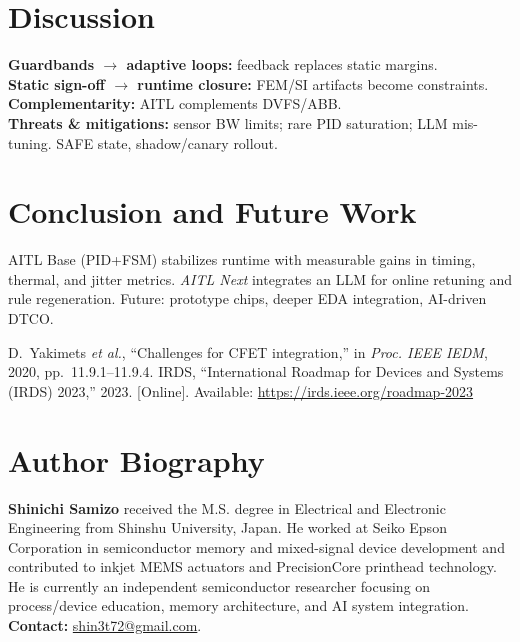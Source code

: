 \documentclass[conference]{IEEEtran}
\newcommand{\etal}{\textit{et al.}}
\begin{document}
\section{Discussion}
\textbf{Guardbands $\rightarrow$ adaptive loops:} feedback replaces static margins.\\
\textbf{Static sign-off $\rightarrow$ runtime closure:} FEM/SI artifacts become constraints.\\
\textbf{Complementarity:} AITL complements DVFS/ABB.\\
\textbf{Threats \& mitigations:} sensor BW limits; rare PID saturation; LLM mis-tuning. SAFE state, shadow/canary rollout.

\section{Conclusion and Future Work}
AITL Base (PID+FSM) stabilizes runtime with measurable gains in timing, thermal, and jitter metrics. \emph{AITL Next} integrates an LLM for online retuning and rule regeneration. Future: prototype chips, deeper EDA integration, AI-driven DTCO.

\begin{thebibliography}{99}
D.~Yakimets \etal, ``Challenges for CFET integration,'' in \emph{Proc. IEEE IEDM}, 2020, pp.~11.9.1--11.9.4.
IRDS, ``International Roadmap for Devices and Systems (IRDS) 2023,'' 2023. [Online]. Available: \url{https://irds.ieee.org/roadmap-2023}
\end{thebibliography}

\section*{Author Biography}
\textbf{Shinichi Samizo} received the M.S. degree in Electrical and Electronic Engineering from Shinshu University, Japan. He worked at Seiko Epson Corporation in semiconductor memory and mixed-signal device development and contributed to inkjet MEMS actuators and PrecisionCore printhead technology. He is currently an independent semiconductor researcher focusing on process/device education, memory architecture, and AI system integration. \textbf{Contact:} \href{mailto:shin3t72@gmail.com}{shin3t72@gmail.com}.
\end{document}
